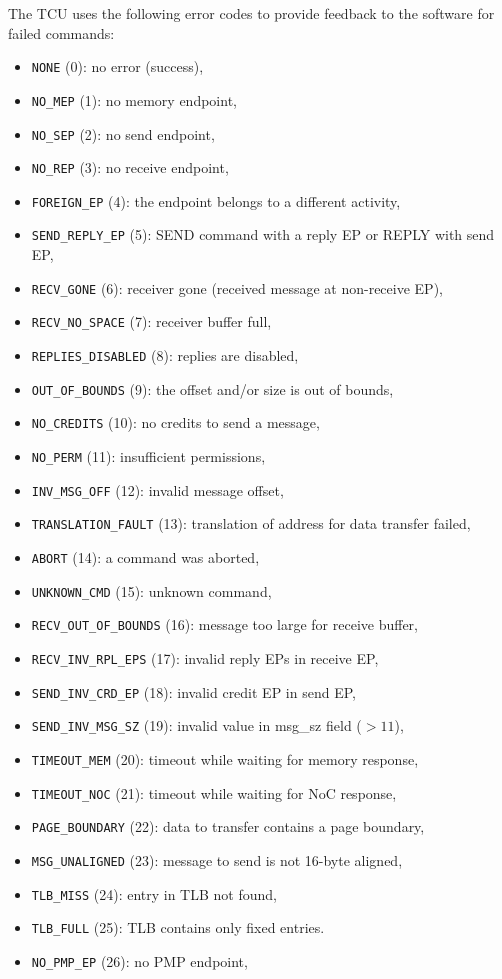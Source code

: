 The TCU uses the following error codes to provide feedback to the software for failed commands:

\begin{itemize}
  \item \texttt{NONE} (0): no error (success),
  \item \texttt{NO\_MEP} (1): no memory endpoint,
  \item \texttt{NO\_SEP} (2): no send endpoint,
  \item \texttt{NO\_REP} (3): no receive endpoint,
  \item \texttt{FOREIGN\_EP} (4): the endpoint belongs to a different activity,
  \item \texttt{SEND\_REPLY\_EP} (5): SEND command with a reply EP or REPLY with send EP,
  \item \texttt{RECV\_GONE} (6): receiver gone (received message at non-receive EP),
  \item \texttt{RECV\_NO\_SPACE} (7): receiver buffer full,
  \item \texttt{REPLIES\_DISABLED} (8): replies are disabled,
  \item \texttt{OUT\_OF\_BOUNDS} (9): the offset and/or size is out of bounds,
  \item \texttt{NO\_CREDITS} (10): no credits to send a message,
  \item \texttt{NO\_PERM} (11): insufficient permissions,
  \item \texttt{INV\_MSG\_OFF} (12): invalid message offset,
  \item \texttt{TRANSLATION\_FAULT} (13): translation of address for data transfer failed,
  \item \texttt{ABORT} (14): a command was aborted,
  \item \texttt{UNKNOWN\_CMD} (15): unknown command,
  \item \texttt{RECV\_OUT\_OF\_BOUNDS} (16): message too large for receive buffer,
  \item \texttt{RECV\_INV\_RPL\_EPS} (17): invalid reply EPs in receive EP,
  \item \texttt{SEND\_INV\_CRD\_EP} (18): invalid credit EP in send EP,
  \item \texttt{SEND\_INV\_MSG\_SZ} (19): invalid value in msg\_sz field ($> 11$),
  \item \texttt{TIMEOUT\_MEM} (20): timeout while waiting for memory response,
  \item \texttt{TIMEOUT\_NOC} (21): timeout while waiting for NoC response,
  \item \texttt{PAGE\_BOUNDARY} (22): data to transfer contains a page boundary,
  \item \texttt{MSG\_UNALIGNED} (23): message to send is not 16-byte aligned,
  \item \texttt{TLB\_MISS} (24): entry in TLB not found,
  \item \texttt{TLB\_FULL} (25): TLB contains only fixed entries.
  \item \texttt{NO\_PMP\_EP} (26): no PMP endpoint,
\end{itemize}
